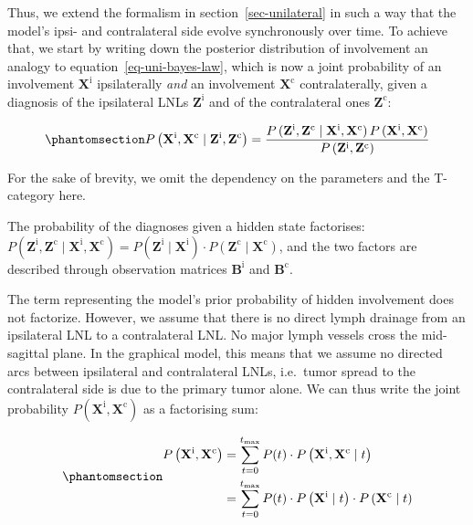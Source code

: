 \documentclass[
  sn-mathphys-num,
]{sn-jnl}
\begin{document}
Thus, we extend the formalism in section~\ref{sec-unilateral} in such a
way that the model's ipsi- and contralateral side evolve synchronously
over time. To achieve that, we start by writing down the posterior
distribution of involvement an analogy to
equation~\ref{eq-uni-bayes-law}, which is now a joint probability of an
involvement \(\mathbf{X}^\text{i}\) ipsilaterally \emph{and} an
involvement \(\mathbf{X}^\text{c}\) contralaterally, given a diagnosis
of the ipsilateral LNLs \(\mathbf{Z}^\text{i}\) and of the contralateral
ones \(\mathbf{Z}^\text{c}\):

\begin{equation}\phantomsection\label{eq-bilateral-bayes}{
P \left( \mathbf{X}^\text{i}, \mathbf{X}^\text{c} \mid \mathbf{Z}^\text{i}, \mathbf{Z}^\text{c} \right) = \frac{P \left( \mathbf{Z}^\text{i}, \mathbf{Z}^\text{c} \mid \mathbf{X}^\text{i}, \mathbf{X}^\text{c} \right) P \left( \mathbf{X}^\text{i}, \mathbf{X}^\text{c} \right)}{P \left( \mathbf{Z}^\text{i}, \mathbf{Z}^\text{c} \right)}
}\end{equation}

For the sake of brevity, we omit the dependency on the parameters and
the T-category here.

The probability of the diagnoses given a hidden state factorises:
\(P \left( \mathbf{Z}^\text{i}, \mathbf{Z}^\text{c} \mid \mathbf{X}^\text{i}, \mathbf{X}^\text{c} \right) = P \left( \mathbf{Z}^\text{i} \mid \mathbf{X}^\text{i} \right) \cdot P \left( \mathbf{Z}^\text{c} \mid \mathbf{X}^\text{c} \right)\),
and the two factors are described through observation matrices
\(\mathbf{B}^\text{i}\) and \(\mathbf{B}^\text{c}\).

The term representing the model's prior probability of hidden
involvement does not factorize. However, we assume that there is no
direct lymph drainage from an ipsilateral LNL to a contralateral LNL. No
major lymph vessels cross the mid-sagittal plane. In the graphical
model, this means that we assume no directed arcs between ipsilateral
and contralateral LNLs, i.e.~tumor spread to the contralateral side is
due to the primary tumor alone. We can thus write the joint probability
\(P \left( \mathbf{X}^\text{i}, \mathbf{X}^\text{c} \right)\) as a
factorising sum:

\begin{equation}\phantomsection\label{eq-bilateral-marginal}{
\begin{aligned}
P \left( \mathbf{X}^\text{i}, \mathbf{X}^\text{c} \right) &= \sum_{t=0}^{t_\text{max}} P(t) \cdot P \left( \mathbf{X}^\text{i}, \mathbf{X}^\text{c} \mid t \right) \\
&= \sum_{t=0}^{t_\text{max}} P(t) \cdot P \left( \mathbf{X}^\text{i} \mid t \right) \cdot P \left( \mathbf{X}^\text{c} \mid t \right)
\end{aligned}
}\end{equation}
\end{document}
